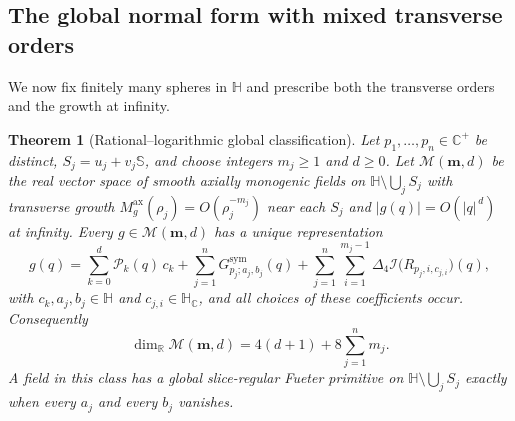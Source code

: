 \documentclass[11pt,a4paper]{article}
\numberwithin{equation}{section}
\newtheorem{theorem}{Theorem}[section]
\theoremstyle{definition}
\theoremstyle{remark}
\theoremstyle{plain}
\newcommand{\HH}{\mathbb H}
\newcommand{\HC}{\mathbb H_{\mathbb C}}
\newcommand{\RR}{\mathbb R}
\newcommand{\CC}{\mathbb C}
\newcommand{\SSS}{\mathbb S}
\newcommand{\Cplus}{\CC^{+}}
\newcommand{\lap}{\Delta_4}
\newcommand{\I}{\mathcal I}
\newcommand{\Max}{M^{\mathrm{ax}}}                    %
\newcommand{\abs}[1]{\lvert #1\rvert}
\begin{document}
\subsection{The global normal form with mixed transverse orders}
\label{e:sec:globalnormal}

We now fix finitely many spheres in $\HH$ and prescribe both the
transverse orders and the growth at infinity.

\begin{theorem}[Rational--logarithmic global classification]
\label{e:thm:globalnormal}
Let $p_1,\dots,p_n\in\Cplus$ be distinct, $S_j=u_j+v_j\SSS$, and choose
integers $m_j\ge1$ and $d\ge0$. Let $\mathcal M(\boldsymbol m,d)$ be the
real vector space of smooth axially monogenic fields on
$\HH\setminus\bigcup_jS_j$ with transverse growth
$\Max_g(\rho_j)=O(\rho_j^{-m_j})$ near each $S_j$ and
$\abs{g(q)}=O(\abs q^{\,d})$ at infinity. Every
$g\in\mathcal M(\boldsymbol m,d)$ has a unique representation
\begin{equation}
 g(q)=\sum_{k=0}^{d}\mathcal P_k(q)\,c_k
   +\sum_{j=1}^{n}G^{\mathrm{sym}}_{p_j;a_j,b_j}(q)
   +\sum_{j=1}^{n}\sum_{i=1}^{m_j-1}
        \lap\I\bigl(R_{p_j,i,c_{j,i}}\bigr)(q),
 \label{e:eq:globalnormal}
\end{equation}
with $c_k,a_j,b_j\in\HH$ and $c_{j,i}\in\HC$, and all choices of these
coefficients occur. Consequently
\begin{equation}
 \dim_{\RR}\mathcal M(\boldsymbol m,d)=4(d+1)+8\sum_{j=1}^{n}m_j .
 \label{e:eq:globaldim}
\end{equation}
A field in this class has a global slice-regular Fueter primitive on
$\HH\setminus\bigcup_jS_j$ exactly when every $a_j$ and every $b_j$
vanishes.
\end{theorem}
\end{document}
